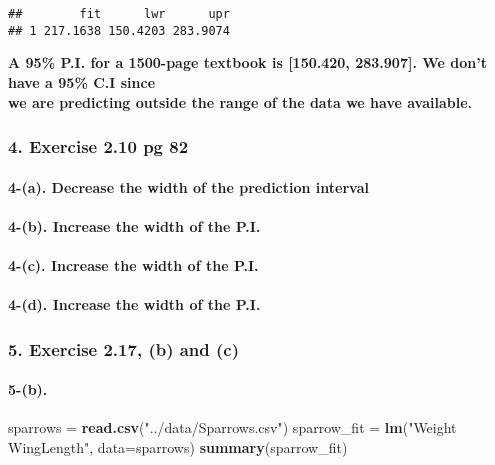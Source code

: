 \documentclass[]{article}
\newenvironment{Shaded}{\begin{snugshade}}{\end{snugshade}}
\newcommand{\KeywordTok}[1]{\textcolor[rgb]{0.13,0.29,0.53}{\textbf{{#1}}}}
\newcommand{\DataTypeTok}[1]{\textcolor[rgb]{0.13,0.29,0.53}{{#1}}}
\newcommand{\StringTok}[1]{\textcolor[rgb]{0.31,0.60,0.02}{{#1}}}
\newcommand{\NormalTok}[1]{{#1}}
\let\oldparagraph\paragraph
\renewcommand{\paragraph}[1]{\oldparagraph{#1}\mbox{}}
\begin{document}
\begin{verbatim}
##        fit      lwr      upr
## 1 217.1638 150.4203 283.9074
\end{verbatim}

\textbf{A 95\% P.I. for a 1500-page textbook is {[}150.420, 283.907{]}.
We don't have a 95\% C.I since\\
we are predicting outside the range of the data we have available.}

\subsubsection{4. Exercise 2.10 pg 82}\label{exercise-2.10-pg-82}

\paragraph{4-(a). Decrease the width of the prediction
interval}\label{a.-decrease-the-width-of-the-prediction-interval}

\paragraph{4-(b). Increase the width of the
P.I.}\label{b.-increase-the-width-of-the-p.i.}

\paragraph{4-(c). Increase the width of the
P.I.}\label{c.-increase-the-width-of-the-p.i.}

\paragraph{4-(d). Increase the width of the
P.I.}\label{d.-increase-the-width-of-the-p.i.}

\subsubsection{5. Exercise 2.17, (b) and
(c)}\label{exercise-2.17-b-and-c}

\paragraph{5-(b).}\label{b.-3}

\begin{Shaded}
\begin{Highlighting}[]
\NormalTok{sparrows =}\StringTok{ }\KeywordTok{read.csv}\NormalTok{(}\StringTok{"../data/Sparrows.csv"}\NormalTok{)}
\NormalTok{sparrow_fit =}\StringTok{ }\KeywordTok{lm}\NormalTok{(}\StringTok{"Weight ~ WingLength"}\NormalTok{, }\DataTypeTok{data=}\NormalTok{sparrows)}
\KeywordTok{summary}\NormalTok{(sparrow_fit)}
\end{Highlighting}
\end{Shaded}
\end{document}
